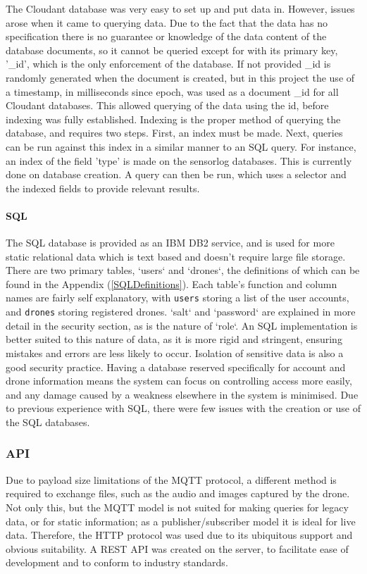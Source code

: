 \documentclass{article}
\begin{document}
The Cloudant database was very easy to set up and put data in. However, issues arose when it came to querying data. Due to the fact that the data has no specification there is no guarantee or knowledge of the data content of the database documents, so it cannot be queried except for with its primary key, '\_id', which is the only enforcement of the database. If not provided \_id is randomly generated when the document is created, but in this project the use of a timestamp, in milliseconds since epoch, was used as a document \_id for all Cloudant databases. This allowed querying of the data using the id, before indexing was fully established. Indexing is the proper method of querying the database, and requires two steps. First, an index must be made. Next, queries can be run against this index in a similar manner to an SQL query. For instance, an index of the field 'type' is made on the sensorlog databases. This is currently done on database creation. A query can then be run, which uses a selector and the indexed fields to provide relevant results.

\paragraph{SQL} \label{SQL}
The SQL database is provided as an IBM DB2 service, and is used for more static relational data which is text based and doesn't require large file storage. There are two primary tables, `users` and `drones`, the definitions of which can be found in the Appendix (\ref{SQLDefinitions}). Each table's function and column names are fairly self explanatory, with \texttt{users} storing a list of the user accounts, and \texttt{drones} storing registered drones. `salt` and `password` are explained in more detail in the security section, as is the nature of `role`. An SQL implementation is better suited to this nature of data, as it is more rigid and stringent, ensuring mistakes and errors are less likely to occur. Isolation of sensitive data is also a good security practice. Having a database reserved specifically for account and drone information means the system can focus on controlling access more easily, and any damage caused by a weakness elsewhere in the system is minimised. Due to previous experience with SQL, there were few issues with the creation or use of the SQL databases. 

\subsubsection{API} \label{API}
Due to payload size limitations of the MQTT protocol, a different method is required to exchange files, such as the audio and images captured by the drone. Not only this, but the MQTT model is not suited for making queries for legacy data, or for static information; as a publisher/subscriber model it is ideal for live data. Therefore, the HTTP protocol was used due to its ubiquitous support and obvious suitability. A REST API was created on the server, to facilitate ease of development and to conform to industry standards. 
\end{document}
